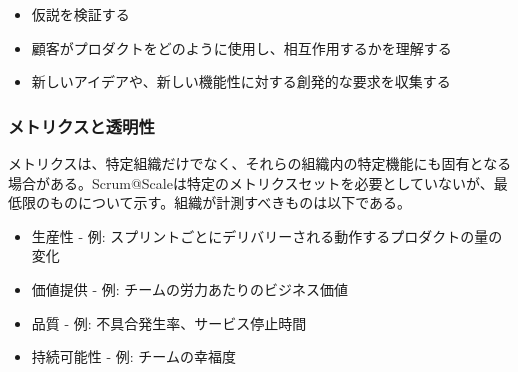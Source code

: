 \documentclass[12pt,a4paper,parskip=full]{scrartcl}
\begin{document}
\begin{itemize}
\itemsep1pt\parskip0pt

\item
仮説を検証する
\item
顧客がプロダクトをどのように使用し、相互作用するかを理解する
\item
新しいアイデアや、新しい機能性に対する創発的な要求を収集する
\end{itemize}

\subsubsection{メトリクスと透明性}\label{Metrics-and-transparency}

メトリクスは、特定組織だけでなく、それらの組織内の特定機能にも固有となる場合がある。Scrum@Scaleは特定のメトリクスセットを必要としていないが、最低限のものについて示す。組織が計測すべきものは以下である。

\begin{itemize}
\itemsep1pt\parskip0pt

\item
生産性 - 例: スプリントごとにデリバリーされる動作するプロダクトの量の変化
\item
価値提供 - 例: チームの労力あたりのビジネス価値
\item
品質 - 例: 不具合発生率、サービス停止時間
\item
持続可能性 - 例: チームの幸福度
\end{itemize}
\end{document}
